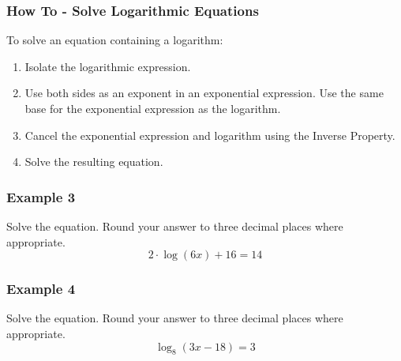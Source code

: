 \documentclass[aspectratio=169,17pt]{beamer}
\begin{document}
\begin{frame}
	\frametitle{How To - Solve Logarithmic Equations}
	To solve an equation containing a logarithm:  
	\begin{enumerate}
		\item Isolate the logarithmic expression.  
		\item Use both sides as an exponent in an exponential expression. Use the same base for the exponential expression as the logarithm.  
		\item Cancel the exponential expression and logarithm using the Inverse Property.  
		\item Solve the resulting equation.
	\end{enumerate}
\end{frame}

\begin{frame}[t]
	\frametitle{Example 3}
	Solve the equation. Round your answer to three decimal places where appropriate.
	$$2 \cdot \log\left(6x\right) + 16 = 14$$
\end{frame}

\begin{frame}[t]
	\frametitle{Example 4}
	Solve the equation. Round your answer to three decimal places where appropriate.
	$$\log_8{\left(3x-18\right)} = 3$$
\end{frame}
\end{document}
